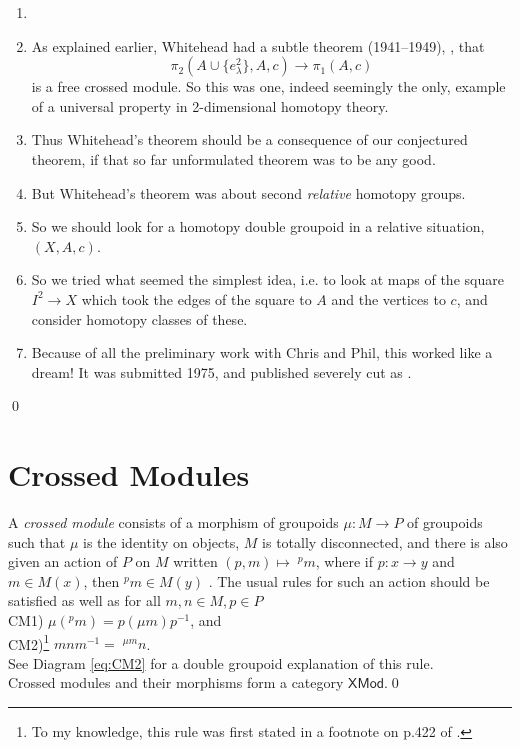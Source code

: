 \documentclass{elsarticle}
\def\XMod{\mathsf{XMod}}
\begin{document}
\begin{strategic}   \label{thm:strategy}



\begin{enumerate}[1.]
\item[]
\item As explained earlier, Whitehead had a subtle theorem (1941--1949), \cite{W41,W49CHII}, that
$$\pi_2(A \cup \{ e^2_\lambda \},A,c) \to \pi_1(A,c) $$
is a free crossed module.  So this was one, indeed seemingly the only, example of a
universal property in 2-dimensional homotopy theory.
\item Thus Whitehead's theorem should be a consequence of our conjectured theorem, if that so far unformulated theorem was to be any good.
\item But Whitehead's theorem was about second {\it relative}  homotopy groups.
\item So we should look for a homotopy double groupoid in a relative situation, $(X, A, c)$.
\item  So we tried what seemed the simplest idea, i.e. to look at maps of the square $I^ 2 \to X$  which took the
edges of the square to $A$  and the vertices to $c$, and consider homotopy classes of these.
\item  Because of all the preliminary work with Chris and Phil, this worked like a dream! It was
submitted 1975, and published severely cut as \cite{BH78sec}.
\end{enumerate}\qed

\end{strategic}

\section{Crossed Modules}\label{sec:xmod}
\begin{Def}\label{defxmod}   A  \emph{crossed  module} consists  of  a  morphism  of  groupoids  $\mu   :  M  \to  P$   of
groupoids such that $\mu$  is the identity on objects, $M$  is totally disconnected, and there is also
given an action of $P$  on $M$   written $(p, m)  \mapsto  \; ^p m$,  where if $p  :  x  \to y$   and $ m \in  M(x)$,
then $^p m \in M(y)$ .   The usual rules for such an action should be satisfied as well as for all
$ m, n \in  M, p \in  P $\\
CM1) $\mu (^pm )= p(\mu m)p^{-1}$, and\\
CM2)\footnote{To my knowledge, this rule was first stated in a footnote on p.422 of \cite{W41}. } $mnm^{-1} = \; ^{\mu m} n$.  \\
See Diagram \ref{eq:CM2} for a double groupoid explanation of this rule. \\
Crossed modules and their morphisms form a category $\XMod$.\qed
\end{Def}
\end{document}
